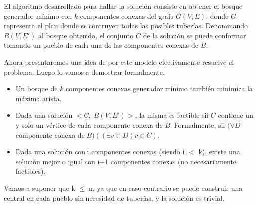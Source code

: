 El algoritmo desarrollado para hallar la solución consiste en obtener el bosque generador mínimo con $k$ componentes conexas del grafo $G(V,E)$, donde $G$ representa el plan donde se contruyen todas las posibles tuberías. Denominando $B(V,E')$ al bosque obtenido, el conjunto $C$ de la solución se puede conformar tomando un pueblo de cada una de las componentes conexas de $B$.

Ahora presentaremos una idea de por este modelo efectivamente resuelve el problema. Luego lo vamos a demostrar formalmente. 

\begin{itemize}
\item Un bosque de $k$ componentes conexas generador mínimo también minimiza la máxima arista.

\item Dada una solución $<C,\;B(V,E')>$, la misma es factible sii $C$ contiene un y solo un vértice de cada componente conexa de $B$. Formalmente, sii $(\forall D$ componente conexa de $B)((\exists v \in D) v \in C)$.  

\item Dada una solución con i componentes conexas (siendo i $<$ k), existe una solución mejor o igual con i+1 componentes conexas (no necesariamente factibles).
\end{itemize}

Vamos a suponer que k $\leq$ n, ya que en caso contrario se puede construir una central en cada pueblo sin necesidad de tuberías, y la solución es trivial.